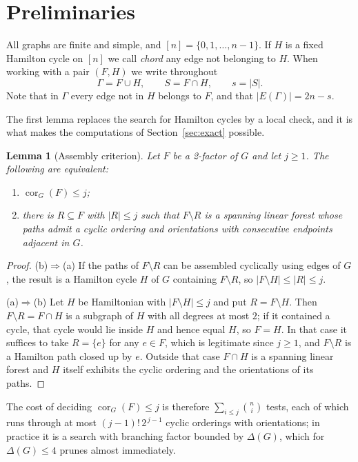 \documentclass[11pt,a4paper]{article}
\newtheorem{lemma}[theorem]{Lemma}
\theoremstyle{definition}
\theoremstyle{remark}
\newcommand{\cor}{\operatorname{cor}}
\begin{document}
\section{Preliminaries}\label{sec:prelim}

All graphs are finite and simple, and $[n]=\{0,1,\dots,n-1\}$. If $H$ is a fixed Hamilton cycle on $[n]$ we call \emph{chord} any edge not belonging to $H$. When working with a pair $(F,H)$ we write throughout
\[
\Gamma=F\cup H,\qquad S=F\cap H,\qquad s=|S| .
\]
Note that in $\Gamma$ every edge not in $H$ belongs to $F$, and that $|E(\Gamma)|=2n-s$.

The first lemma replaces the search for Hamilton cycles by a local check, and it is what makes the computations of Section~\ref{sec:exact} possible.

\begin{lemma}[Assembly criterion]\label{lem:assembly}
Let $F$ be a 2-factor of $G$ and let $j\ge1$. The following are equivalent:
\begin{enumerate}[label=(\alph*)]
\item $\cor_G(F)\le j$;
\item there is $R\subseteq F$ with $|R|\le j$ such that $F\setminus R$ is a spanning linear forest whose paths admit a cyclic ordering and orientations with consecutive endpoints adjacent in $G$.
\end{enumerate}
\end{lemma}

\begin{proof}
(b)$\Rightarrow$(a) If the paths of $F\setminus R$ can be assembled cyclically using edges of $G$, the result is a Hamilton cycle $H$ of $G$ containing $F\setminus R$, so $|F\setminus H|\le|R|\le j$.

(a)$\Rightarrow$(b) Let $H$ be Hamiltonian with $|F\setminus H|\le j$ and put $R=F\setminus H$. Then $F\setminus R=F\cap H$ is a subgraph of $H$ with all degrees at most $2$; if it contained a cycle, that cycle would lie inside $H$ and hence equal $H$, so $F=H$. In that case it suffices to take $R=\{e\}$ for any $e\in F$, which is legitimate since $j\ge1$, and $F\setminus R$ is a Hamilton path closed up by $e$. Outside that case $F\cap H$ is a spanning linear forest and $H$ itself exhibits the cyclic ordering and the orientations of its paths.
\end{proof}

The cost of deciding $\cor_G(F)\le j$ is therefore $\sum_{i\le j}\binom{n}{i}$ tests, each of which runs through at most $(j-1)!\,2^{\,j-1}$ cyclic orderings with orientations; in practice it is a search with branching factor bounded by $\Delta(G)$, which for $\Delta(G)\le4$ prunes almost immediately.
\end{document}
